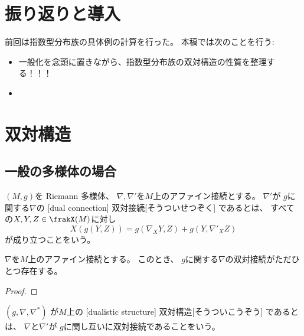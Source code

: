 \documentclass[report]{jlreq}
\begin{document}
%

%
\section*{振り返りと導入}

前回は指数型分布族の具体例の計算を行った。
本稿では次のことを行う:
\begin{itemize}
    \item 一般化を念頭に置きながら、指数型分布族の双対構造の性質を整理する！！！
    \item \TODO{}
\end{itemize}

%
\section{双対構造}

\subsection{一般の多様体の場合}

\begin{definition}[双対接続]
    $(M, g)$を Riemann 多様体、
    $\nabla, \nabla'$を$M$上のアファイン接続とする。
    $\nabla'$が
    $g$に関する$\nabla$の
    [dual connection]
        {双対接続}[そうついせつぞく]
    であるとは、
    すべての$X, Y, Z \in \frakX(M)$に対し
    \begin{equation}
        X(g(Y, Z))
            =
                g(\nabla_X Y, Z) + g(Y, \nabla'_X Z)
    \end{equation}
    が成り立つことをいう。
\end{definition}

\begin{proposition}
    $\nabla$を$M$上のアファイン接続とする。
    このとき、
    $g$に関する$\nabla$の双対接続がただひとつ存在する。
\end{proposition}

\begin{proof}
    \TODO{}
\end{proof}

\begin{definition}[双対構造]
    $(g, \nabla, \nabla^*)$
    が$M$上の
    [dualistic structure]
        {双対構造}[そうついこうぞう]
    であるとは、
    $\nabla$と$\nabla'$が
    $g$に関し互いに双対接続であることをいう。
\end{definition}
\end{document}
